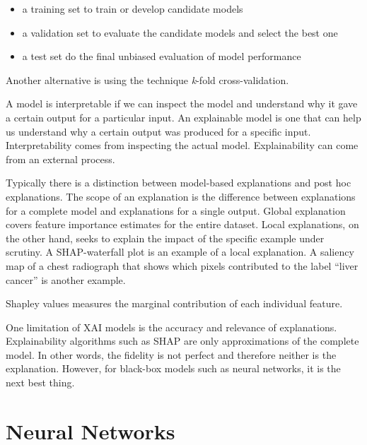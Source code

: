 \begin{itemize}
    \item a training set to train or develop candidate models
    \item a validation set to evaluate the candidate models
        and select the best one
    \item a test set do the final unbiased evaluation of model performance
\end{itemize}

Another alternative is using the technique \textit{k}-fold cross-validation.

A model is interpretable if we can inspect the model
and understand why it gave a certain output for a particular input.
An explainable model is one that can help us understand 
why a certain output was produced for a specific input.
Interpretability comes from inspecting the actual model.
Explainability can come from an external process.

Typically there is a distinction between model-based explanations
and post hoc explanations\autocite{vanderveldenExplainable2022}.
The scope of an explanation is the difference between
explanations for a complete model and
explanations for a single output.
Global explanation covers feature importance estimates 
for the entire dataset.
Local explanations, on the other hand, seeks to explain
the impact of the specific example under scrutiny.
A SHAP-waterfall plot is an example of a local explanation.
A saliency map of a chest radiograph that shows
which pixels contributed to the label \enquote{liver cancer}
is another example.

Shapley values measures the marginal contribution
of each individual feature.

One limitation of XAI models is the accuracy and relevance of explanations.
Explainability algorithms such as SHAP are only approximations
of the complete model.
In other words, the fidelity is not perfect and therefore neither
is the explanation.
However, for black-box models such as neural networks,
it is the next best thing.

\section{Neural Networks}


